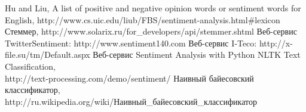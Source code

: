\documentclass[14pt,a4paper]{scrartcl}
\begin{document}
\newpage
\begin{thebibliography}{0}
 Hu and Liu, A list of positive and negative opinion words or sentiment words for English, http://www.cs.uic.edu/liub/FBS/sentiment-analysis.html\#lexicon
 Стеммер, http://www.solarix.ru/for\_developers/api/stemmer.shtml
 Веб-сервис TwitterSentiment: http://www.sentiment140.com
 Веб-сервис I‐Teco: http://x-file.su/tm/Default.aspx
 Веб-сервис Sentiment Analysis with Python NLTK Text Classification,\\ http://text-processing.com/demo/sentiment/
 Наивный	байесовский	классификатор,\\ http://ru.wikipedia.org/wiki/Наивный\_байесовский\_классификатор
\end{thebibliography}
\end{document}
